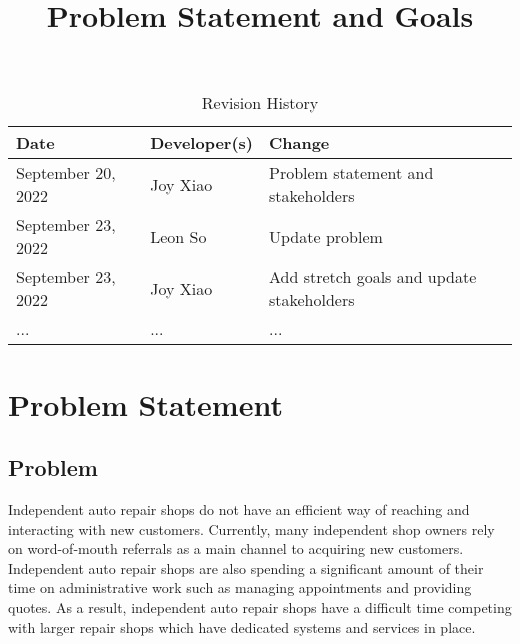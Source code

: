 \documentclass{article}
\title{Problem Statement and Goals\\\progname}
\author{\authname}
\date{}
\begin{document}
\maketitle

\begin{table}[hp]
  \caption{Revision History} \label{TblRevisionHistory}
  \begin{tabularx}{\textwidth}{llX}
    \toprule
    \textbf{Date}      & \textbf{Developer(s)} & \textbf{Change}                           \\
    \midrule
    September 20, 2022 & Joy Xiao              & Problem statement and stakeholders        \\
    September 23, 2022 & Leon So               & Update problem                            \\
    September 23, 2022 & Joy Xiao              & Add stretch goals and update stakeholders \\
    ...                & ...                   & ...                                       \\
    \bottomrule
  \end{tabularx}
\end{table}

\section{Problem Statement}


\subsection{Problem}
Independent auto repair shops do not have an efficient way of reaching and interacting with new
customers. Currently, many independent shop owners rely on word-of-mouth referrals as a main
channel to acquiring new customers. Independent auto repair shops are also spending a significant
amount of their time on administrative work such as managing appointments and providing quotes. As
a result, independent auto repair shops have a difficult time competing with larger repair shops
which have dedicated systems and services in place.\\
\end{document}
